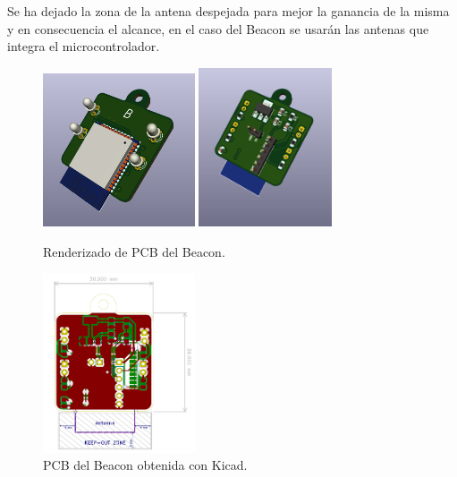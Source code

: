 \documentclass[paper=a4, fontsize=11pt,twoside]{scrartcl}	%
\begin{document}
        Se ha dejado la zona de la antena despejada para mejor la ganancia de la misma y en consecuencia el alcance, en el caso 
        del Beacon se usarán las antenas que integra el microcontrolador.
        \begin{center}
            \begin{figure}[ht]
                \centering
                \includegraphics[width=0.4\textwidth]{../emiter_1.PNG}
                \includegraphics[width=0.35\textwidth]{../emiter_2.PNG}
                \caption{Renderizado de PCB del Beacon.}
                \label{fig:mesh8}
            \end{figure}    
        \end{center}
        \begin{center}
            \begin{figure}[ht]
                \centering
                \includegraphics[width=0.40\textwidth]{../emiter_PCB.PNG}
                \caption{PCB del Beacon obtenida con Kicad.}
                \label{fig:mesh9}
            \end{figure}    
        \end{center}
\end{document}
